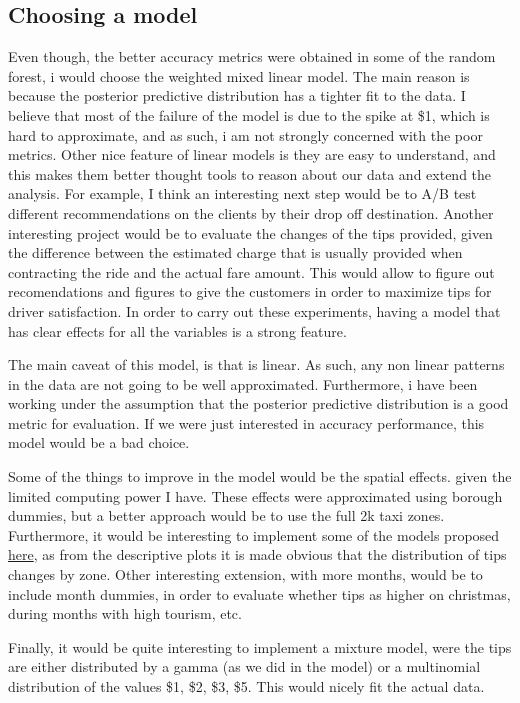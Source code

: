 \documentclass[11pt]{article}
\begin{document}
\subsection{Choosing a model}
\label{sec:org5c42c4c}
Even though, the better accuracy metrics were obtained in some of the
random forest, i would choose the weighted mixed linear model.
The main reason is because the posterior predictive distribution
has a tighter fit to the data. I believe that most of the failure of the
model is due to the spike at \$1, which is hard to approximate, and as such,
i am not strongly concerned with the poor metrics.
Other nice feature of linear models is they are easy to understand, and this
makes them better thought tools to reason about our data and extend the analysis.
For example, I think an interesting next step would be to A/B test different
recommendations on the clients by their drop off destination. Another
interesting project would be to evaluate the changes of the tips provided,
given the difference between the estimated charge that is usually provided
when contracting the ride and the actual fare amount.
This would allow to figure out recomendations and figures to give the
customers in order to maximize tips for driver satisfaction. In order to
carry out these experiments, having a model that has clear effects for
all the variables is a strong feature.

The main caveat of this model, is that is linear. As such, any non linear
patterns in the data are not going to be well approximated. Furthermore,
i have been working under the assumption that the posterior predictive
distribution is a good metric for evaluation. If we were just interested
in accuracy performance, this model would be a bad choice.

Some of the things to improve in the model would be the spatial effects.
given the limited computing power I have. These effects were approximated
using borough dummies, but a better approach would be to use the full 2k
taxi zones. Furthermore, it would be interesting to implement some of the
models proposed \href{https://mc-stan.org/users/documentation/case-studies/icar\_stan.html}{here}, as from the descriptive plots it is made obvious that
the distribution of tips changes by zone.
Other interesting extension, with more months, would be to include month
dummies, in order to evaluate whether tips as higher on christmas, during
months with high tourism, etc.

Finally, it would be quite interesting to implement a mixture model,
were the tips are either distributed by a gamma (as we did in the model)
or a multinomial distribution of the values \$1, \$2, \$3, \$5. This would
nicely fit the actual data.
\end{document}
